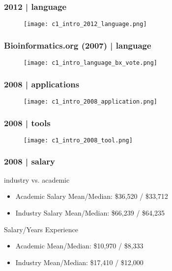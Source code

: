 \begin{frame}
  \frametitle{2012 | language}
   \begin{figure}
     \centering
     \texttt{[image: c1\_intro\_2012\_language.png]}
   \end{figure}
\end{frame}

\begin{frame}
  \frametitle{Bioinformatics.org (2007) | language}
   \begin{figure}
     \centering
     \texttt{[image: c1\_intro\_language\_bx\_vote.png]}
   \end{figure}
\end{frame}


\begin{frame}
  \frametitle{2008 | applications}
   \begin{figure}
     \centering
     \texttt{[image: c1\_intro\_2008\_application.png]}
   \end{figure}
\end{frame}

\begin{frame}
  \frametitle{2008 | tools}
   \begin{figure}
     \centering
     \texttt{[image: c1\_intro\_2008\_tool.png]}
   \end{figure}
\end{frame}

\begin{frame}
  \frametitle{2008 | salary}
  \begin{block}{industry vs. academic}
    \begin{itemize}
      \item Academic Salary Mean/Median: \$36,520 / \$33,712
      \item Industry Salary Mean/Median: \$66,239 / \$64,235
    \end{itemize}
  \end{block}
  \pause
  \begin{block}{Salary/Years Experience}
    \begin{itemize}
      \item Academic Mean/Median: \$10,970 / \$8,333
      \item Industry Mean/Median: \$17,410 / \$12,000
    \end{itemize}
  \end{block}
\end{frame}

